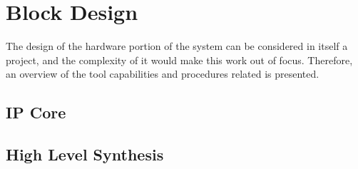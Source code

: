 \section{Block Design}

The design of the hardware portion of the system can be considered in itself a project, and the
complexity of it would make this work out of focus. Therefore, an overview of the tool capabilities
and procedures related is presented.




\subsection{IP Core}

\subsection{High Level Synthesis}
